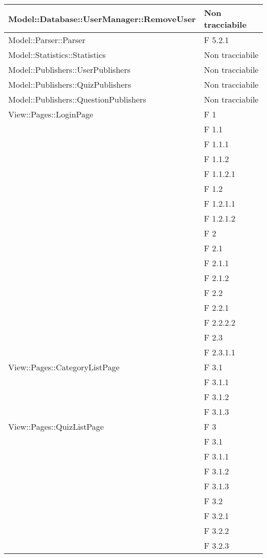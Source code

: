 \begin{longtable}{p{}p{}}
\midrule
Model::Database::UserManager::RemoveUser	& Non tracciabile\\

\midrule
Model::Parser::Parser		& F 5.2.1\\

\midrule
Model::Statistics::Statistics	& Non tracciabile\\

\midrule
Model::Publishers::UserPublishers	& Non tracciabile\\

\midrule
Model::Publishers::QuizPublishers	& Non tracciabile\\

\midrule
Model::Publishers::QuestionPublishers	& Non tracciabile\\




\midrule
View::Pages::LoginPage						& F 1\\
								& F 1.1\\
								& F 1.1.1\\
								& F 1.1.2\\
								& F 1.1.2.1\\
								& F 1.2\\
								& F 1.2.1.1\\
								& F 1.2.1.2\\
								& F 2\\
								& F 2.1\\
								& F 2.1.1\\
								& F 2.1.2\\
								& F 2.2\\
								& F 2.2.1\\
								& F 2.2.2.2\\
								& F 2.3\\
								& F 2.3.1.1\\

\midrule
View::Pages::CategoryListPage					& F 3.1\\
								& F 3.1.1\\
								& F 3.1.2\\
								& F 3.1.3\\

\midrule
View::Pages::QuizListPage					& F 3\\
								& F 3.1\\
								& F 3.1.1\\
								& F 3.1.2\\
								& F 3.1.3\\
								& F 3.2\\
								& F 3.2.1\\
								& F 3.2.2\\
								& F 3.2.3\\
								

\end{longtable}
